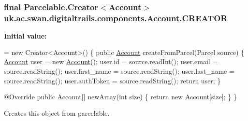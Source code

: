 \hypertarget{classuk_1_1ac_1_1swan_1_1digitaltrails_1_1components_1_1_account_a6de506f36d5240760bcd36208be882ed}{
\subsubsection[{C\+R\+E\+A\+T\+O\+R}]{\setlength{\rightskip}{0pt plus 5cm}final Parcelable.\+Creator$<${\bf Account}$>$ uk.\+ac.\+swan.\+digitaltrails.\+components.\+Account.\+C\+R\+E\+A\+T\+O\+R\hspace{0.3cm}{\ttfamily [static]}}}\label{classuk_1_1ac_1_1swan_1_1digitaltrails_1_1components_1_1_account_a6de506f36d5240760bcd36208be882ed}
{\bfseries Initial value\+:}
\begin{DoxyCode}
= \textcolor{keyword}{new} Creator<Account>() \{  
        \textcolor{keyword}{public} \hyperlink{classuk_1_1ac_1_1swan_1_1digitaltrails_1_1components_1_1_account_a2bb28b85523b20bfc58c7357309f40e0}{Account} createFromParcel(Parcel source) \{ 
            \hyperlink{classuk_1_1ac_1_1swan_1_1digitaltrails_1_1components_1_1_account_a2bb28b85523b20bfc58c7357309f40e0}{Account} user = \textcolor{keyword}{new} \hyperlink{classuk_1_1ac_1_1swan_1_1digitaltrails_1_1components_1_1_account_a2bb28b85523b20bfc58c7357309f40e0}{Account}();
            user.id = source.readInt();
            user.email = source.readString();
            user.first\_name = source.readString();
            user.last\_name = source.readString();
            user.authToken = source.readString();
            \textcolor{keywordflow}{return} user; 
        \}

        @Override
        \textcolor{keyword}{public} \hyperlink{classuk_1_1ac_1_1swan_1_1digitaltrails_1_1components_1_1_account_a2bb28b85523b20bfc58c7357309f40e0}{Account}[] newArray(\textcolor{keywordtype}{int} size) \{
            \textcolor{keywordflow}{return} \textcolor{keyword}{new} \hyperlink{classuk_1_1ac_1_1swan_1_1digitaltrails_1_1components_1_1_account_a2bb28b85523b20bfc58c7357309f40e0}{Account}[size];
        \}   
    \}
\end{DoxyCode}


Creates this object from parcelable. 

